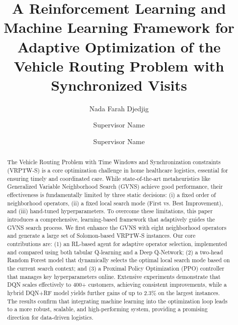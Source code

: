 \documentclass[preprint,12pt]{elsarticle}
\begin{document}
\raggedbottom

\begin{frontmatter}

\title{A Reinforcement Learning and Machine Learning Framework for Adaptive Optimization of the Vehicle Routing Problem with Synchronized Visits}

\author[1]{Nada Farah Djedjig}
\author[1]{Supervisor Name}
\author[1]{Supervisor Name}

\address[1]{Department of Computer Science, University Name, City, Country}

\begin{abstract}
The Vehicle Routing Problem with Time Windows and Synchronization constraints (VRPTW‑S) is a core optimization challenge in home healthcare logistics, essential for ensuring timely and coordinated care. While state‑of‑the‑art metaheuristics like Generalized Variable Neighborhood Search (GVNS) achieve good performance, their effectiveness is fundamentally limited by three static decisions: (i) a fixed order of neighborhood operators, (ii) a fixed local search mode (First vs. Best Improvement), and (iii) hand‑tuned hyperparameters. To overcome these limitations, this paper introduces a comprehensive, learning-based framework that adaptively guides the GVNS search process. We first enhance the GVNS with eight neighborhood operators and generate a large set of Solomon-based VRPTW‑S instances. Our core contributions are: (1) an RL-based agent for adaptive operator selection, implemented and compared using both tabular Q‑learning and a Deep Q‑Network; (2) a two‑head Random Forest model that dynamically selects the optimal local search mode based on the current search context; and (3) a Proximal Policy Optimization (PPO) controller that manages key hyperparameters online. Extensive experiments demonstrate that DQN scales effectively to 400+ customers, achieving consistent improvements, while a hybrid DQN+RF model yields further gains of up to 2.3\% on the largest instances. The results confirm that integrating machine learning into the optimization loop leads to a more robust, scalable, and high-performing system, providing a promising direction for data-driven logistics.
\end{abstract}


\end{frontmatter}
\end{document}
